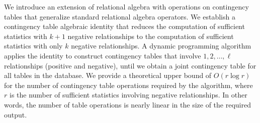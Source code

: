 \documentclass{acm_proc_article-sp}
\begin{document}
%

We introduce an extension of relational algebra with operations on contingency tables that generalize standard relational algebra operators. 
We establish a contingency table algebraic identity that reduces the computation of sufficient statistics with $k+1$ negative relationships to the computation of sufficient statistics with only $k$ negative relationships. 
A dynamic programming algorithm applies the identity to construct contingency tables that involve $1,2,\ldots,\ell$ relationships (positive and negative), until we obtain a joint contingency table for all tables in the database. We provide a theoretical upper bound of $O(r \log r)$ for the number of contingency table operations required by the algorithm, where $r$ is the number of sufficient statistics involving negative relationships. In other words, the number of table operations is nearly linear in the size of the required output. 
\end{document}
